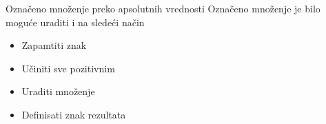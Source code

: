 
\begin{frame}[label=05-s044]{Označeno množenje preko apsolutnih vrednosti}
Označeno množenje je bilo moguće uraditi i na sledeći način
\begin{itemize}\item Zapamtiti znak\item Učiniti sve pozitivnim\item Uraditi množenje\item Definisati znak rezultata\end{itemize}
\vspace{3mm}
\end{frame}
